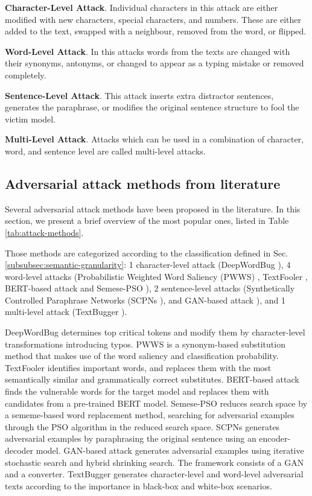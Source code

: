 \textbf{Character-Level Attack}. Individual characters in this attack are either modified with new characters, special characters, and numbers. These are either added to the text, swapped with a neighbour, removed from the word, or flipped.

\textbf{Word-Level Attack}. In this attacks words from the texts are changed with their synonyms, antonyms, or changed to appear as a typing mistake or removed completely.

\textbf{Sentence-Level Attack}. This attack inserts extra distractor sentences, generates the paraphrase, or modifies the original sentence structure to fool the victim model.

\textbf{Multi-Level Attack}. Attacks which can be used in a combination of character, word, and sentence level are called multi-level attacks.

\subsection{Adversarial attack methods from literature}\label{subsec:aam-from-literature}

Several adversarial attack methods have been proposed in the literature. In this section, we present a brief overview of the most popular ones, listed in Table \ref{tab:attack-methods}.

Those methods are categorized according to the classification defined in Sec. \ref{subsubsec:semantic-granularity}:
1 character-level attack (DeepWordBug \cite{journals/corr/abs-1801-04354}), 4 word-level attacks (Probabilistic Weighted Word Saliency (PWWS) \cite{conf/acl/RenDHC19}, TextFooler \cite{journals/corr/abs-1907-11932}, BERT-based attack \cite{conf/emnlp/LiMGXQ20} and Semese-PSO \cite{conf/acl/ZangQYLZLS20}), 2 sentence-level attacks (Synthetically Controlled Paraphrase Networks (SCPNs \cite{conf/naacl/IyyerWGZ18}), and GAN-based attack \cite{journals/corr/abs-1710-11342}), and 1 multi-level attack (TextBugger \cite{conf/ndss/LiJDLW19}).

DeepWordBug determines top critical tokens and modify them by character-level transformations introducing typos. 
PWWS is a synonym-based substitution method that makes use of the word saliency and classification probability.
TextFooler identifies important words, and replaces them with the most semantically similar and grammatically correct substitutes.
BERT-based attack finds the vulnerable words for the target model and replaces them with candidates from a pre-trained BERT model.
Semese-PSO reduces search space by a sememe-based word replacement method, searching for adversarial examples through the PSO algorithm in the reduced search space.
SCPNs generates adversarial examples by paraphrasing the original sentence using an encoder-decoder model.
GAN-based attack generates adversarial examples using iterative stochastic search and hybrid shrinking search. The framework consists of a GAN and a converter.
TextBugger generates character-level and word-level adversarial texts according to the importance in black-box and white-box scenarios.

